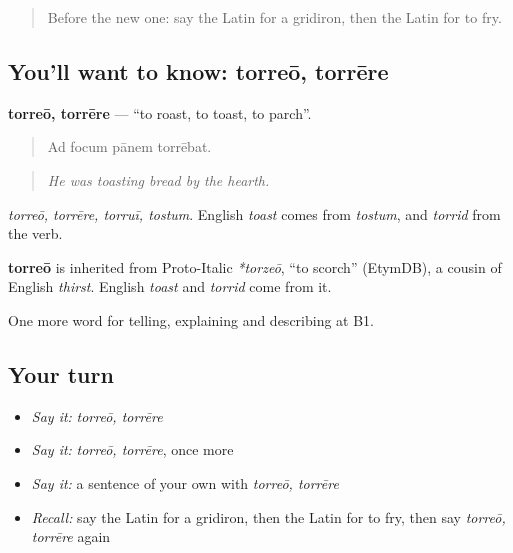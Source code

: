 \label{lesson:LA-C354-torreo}



\begin{quote}
Before the new one: say the Latin for a gridiron, then the Latin for to fry.
\end{quote}

\subsection*{You'll want to know: torreō, torrēre}
\textbf{torreō, torrēre} — \textquotedblleft{}to roast, to toast, to parch\textquotedblright{}.

\begin{quote}
Ad focum pānem torrēbat.
\end{quote}

\begin{quote}
\emph{He was toasting bread by the hearth.}
\end{quote}

\emph{torreō, torrēre, torruī, tostum}. English \emph{toast} comes from \emph{tostum}, and \emph{torrid} from the verb.

\begin{cousinweb}
\textbf{torreō} is inherited from Proto-Italic \emph{*torzeō}, \textquotedblleft{}to scorch\textquotedblright{} (EtymDB), a cousin of English \emph{thirst}. English \emph{toast} and \emph{torrid} come from it.
\end{cousinweb}

\begin{grammarlens}[title={What you've built}]
One more word for telling, explaining and describing at B1.
\end{grammarlens}

\subsection*{Your turn}
\begin{itemize}
\raggedright
  \item \emph{Say it:} \emph{torreō, torrēre}
  \item \emph{Say it:} \emph{torreō, torrēre}, once more
  \item \emph{Say it:} a sentence of your own with \emph{torreō, torrēre}
  \item \emph{Recall:} say the Latin for a gridiron, then the Latin for to fry, then say \emph{torreō, torrēre} again
\end{itemize}

